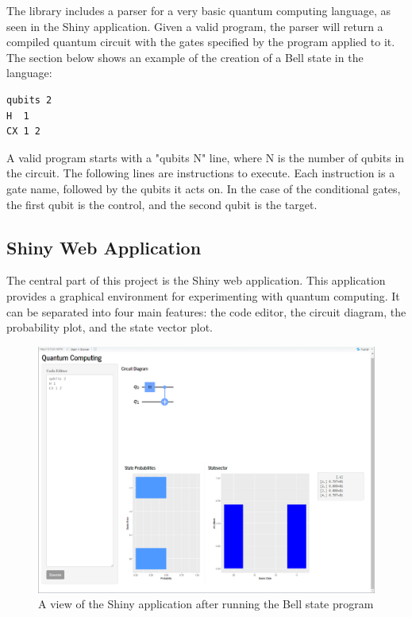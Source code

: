\documentclass{article}
\begin{document}
The library includes a parser for a very basic quantum computing language, as seen in the Shiny application. Given a valid program, the parser will return a compiled quantum circuit with the gates specified by the program applied to it. The section below shows an example of the creation of a Bell state in the language:

\newpage

\begin{lstlisting}[caption={Bell state in quantum programming language}]
qubits 2
H  1
CX 1 2
\end{lstlisting}

A valid program starts with a "qubits N" line, where N is the number of qubits in the circuit. The following lines are instructions to execute. Each instruction is a gate name, followed by the qubits it acts on. In the case of the conditional gates, the first qubit is the control, and the second qubit is the target.


\subsection{Shiny Web Application}
The central part of this project is the Shiny web application. This application provides a graphical environment for experimenting with quantum computing. It can be separated into four main features: the code editor, the circuit diagram, the probability plot, and the state vector plot.

\begin{figure}[h!]
    \centering
    \includegraphics[width=\linewidth]{editor.png}
    \caption{A view of the Shiny application after running the Bell state program}
    \label{fig:shiny_app}
\end{figure}
\end{document}
